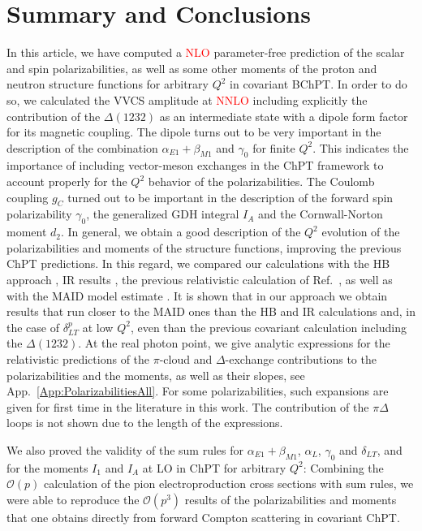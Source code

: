 \documentclass[twocolumn,prc,showpacs,nofootinbib,preprintnumbers,amsmath,amssymb,superscriptaddress]{revtex4-1}
\begin{document}
\section{Summary and Conclusions}\label{Sec:Summary}

In this article, we have computed a \textcolor{red}{NLO} parameter-free prediction of the scalar and spin polarizabilities, as well as some other moments of the proton and neutron structure functions for arbitrary $Q^2$ in covariant BChPT. 
In order to do so, we calculated the VVCS amplitude at \textcolor{red}{NNLO} including explicitly the contribution of the $\Delta(1232)$ as an intermediate state with a dipole form factor for its magnetic coupling. 
The dipole turns out to be very important in the description of the combination $\alpha_{E1}+\beta_{M1}$ and $\gamma_0$ for finite $Q^2$.
This indicates the importance of including vector-meson exchanges in the ChPT framework to account properly for the $Q^2$ behavior of the polarizabilities. The Coulomb coupling $g_C$ turned out to be important in the description of the forward spin polarizability $\gamma_0$, the generalized GDH integral $I_A$ and the Cornwall-Norton moment $d_2$.
In general, we obtain a good description of the $Q^2$ evolution of the polarizabilities and moments of the structure functions, improving the previous ChPT predictions.
In this regard, we compared our calculations with the HB approach \cite{Kao:2002cp}, IR results \cite{Bernard:2002pw}, the previous relativistic calculation of Ref.~\cite{Bernard:2012hb}, as well as with the MAID model estimate \cite{MAID}. 
It is shown that in our approach we obtain results that run closer to the MAID ones than the HB and IR calculations and, in the case of $\delta^p_{LT}$ at low $Q^2$, even than the previous covariant calculation including the $\Delta(1232)$. 
At the real photon point, we give analytic expressions for the relativistic predictions of the $\pi$-cloud and $\Delta$-exchange contributions to the polarizabilities and the moments, as well as their slopes, see App.~\ref{App:PolarizabilitiesAll}.
For some polarizabilities, such expansions are given for first time in the literature in this work. 
The contribution of the $\pi \Delta$ loops is not shown due to the length of the  expressions.
 
We also proved the validity of the sum rules for $\alpha_{E1}+\beta_{M1}$, $\alpha_L$, $\gamma_0$ and $\delta_{LT}$, and for the moments $I_1$ and $I_A$ at LO in ChPT for arbitrary $Q^2$:
Combining the $\mathcal{O}(p)$ calculation of the pion electroproduction cross sections with sum rules, we were able to reproduce the $\mathcal{O}(p^3)$ results of the polarizabilities and moments that one obtains directly from forward Compton scattering in covariant ChPT.
\end{document}
